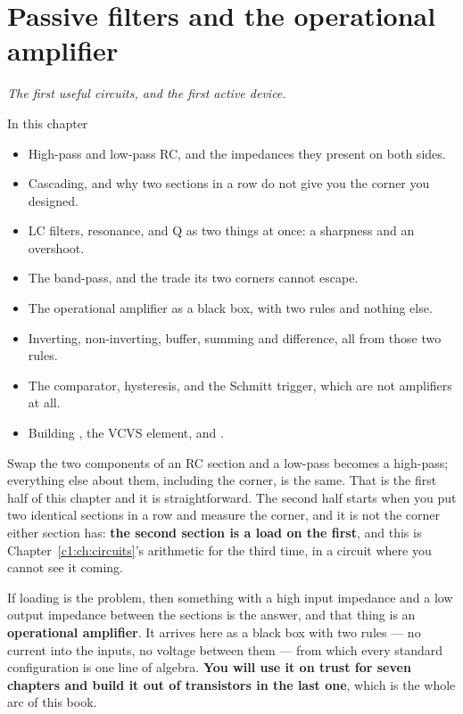 
\chapter{Passive filters and the operational amplifier}
\label{c3:ch:filters}

{\large\itshape The first useful circuits, and the first active device.\par}

\begin{chapterbox}{In this chapter}
\begin{itemize}
  \item High-pass and low-pass RC, and the impedances they present on both sides.
  \item Cascading, and why two sections in a row do not give you the corner you designed.
  \item LC filters, resonance, and Q as two things at once: a sharpness and an overshoot.
  \item The band-pass, and the trade its two corners cannot escape.
  \item The operational amplifier as a black box, with two rules and nothing else.
  \item Inverting, non-inverting, buffer, summing and difference, all from those two rules.
  \item The comparator, hysteresis, and the Schmitt trigger, which are not amplifiers at all.
  \item Building , the VCVS element, and .
\end{itemize}
\end{chapterbox}

Swap the two components of an RC section and a low-pass becomes a high-pass; everything else about
them, including the corner, is the same. That is the first half of this chapter and it is
straightforward. The second half starts when you put two identical sections in a row and measure
the corner, and it is not the corner either section has: \textbf{the second section is a load on
the first}, and this is Chapter~\ref{c1:ch:circuits}'s arithmetic for the third time, in a circuit
where you cannot see it coming.

If loading is the problem, then something with a high input impedance and a low output impedance
between the sections is the answer, and that thing is an \textbf{operational amplifier}. It arrives
here as a black box with two rules --- no current into the inputs, no voltage between them --- from
which every standard configuration is one line of algebra. \textbf{You will use it on trust for
seven chapters and build it out of transistors in the last one}, which is the whole arc of this
book.


